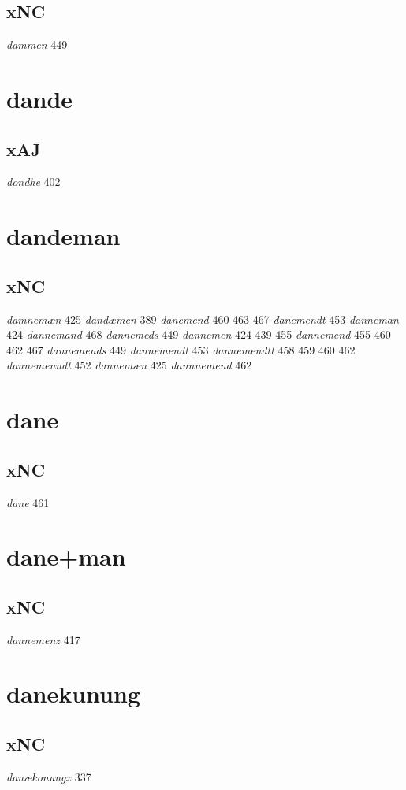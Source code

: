 \documentclass[a4paper,twocolumn]{article}
\begin{document}
\subsection{xNC}
\label{sec:org784f178}
\emph{dammen} 449 
\section{dande}
\label{sec:org4c62ffc}
\subsection{xAJ}
\label{sec:org33cdb23}
\emph{dondhe} 402 
\section{dandeman}
\label{sec:org77bd483}
\subsection{xNC}
\label{sec:org3b5c48d}
\emph{damnemæn} 425 \emph{dandæmen} 389 \emph{danemend} 460 463 467 \emph{danemendt} 453 \emph{danneman} 424 \emph{dannemand} 468 \emph{dannemeds} 449 \emph{dannemen} 424 439 455 \emph{dannemend} 455 460 462 467 \emph{dannemends} 449 \emph{dannemendt} 453 \emph{dannemendtt} 458 459 460 462 \emph{dannemenndt} 452 \emph{dannemæn} 425 \emph{dannnemend} 462 
\section{dane}
\label{sec:org2cd4b6b}
\subsection{xNC}
\label{sec:org717f1bd}
\emph{dane} 461 
\section{dane+man}
\label{sec:org979485b}
\subsection{xNC}
\label{sec:org06871e8}
\emph{dannemenz} 417 
\section{danekunung}
\label{sec:org7a432af}
\subsection{xNC}
\label{sec:orgec63ee0}
\emph{danækonungx} 337 
\end{document}
